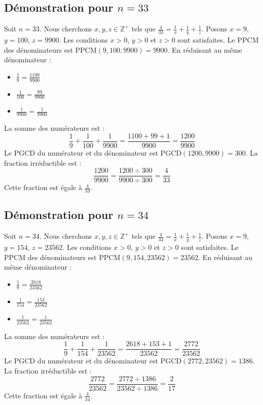 \documentclass[11pt,a4paper]{article}
\begin{document}
\subsection{Démonstration pour $n = 33$}
Soit $n = 33$. Nous cherchons $x, y, z \in \mathbb{Z}^{+}$ tels que $\frac{4}{33} = \frac{1}{x} + \frac{1}{y} + \frac{1}{z}$.
Posons $x = 9$, $y = 100$, $z = 9900$.
Les conditions $x > 0$, $y > 0$ et $z > 0$ sont satisfaites.
Le PPCM des dénominateurs est $\text{PPCM}(9, 100, 9900) = 9900$.
En réduisant au même dénominateur :
\begin{itemize}
    \item $\frac{1}{9} = \frac{1100}{9900}$
    \item $\frac{1}{100} = \frac{99}{9900}$
    \item $\frac{1}{9900} = \frac{1}{9900}$
\end{itemize}
La somme des numérateurs est :
$$ \frac{1}{9} + \frac{1}{100} + \frac{1}{9900} = \frac{1100 + 99 + 1}{9900} = \frac{1200}{9900} $$
Le PGCD du numérateur et du dénominateur est $\text{PGCD}(1200, 9900) = 300$.
La fraction irréductible est :
$$ \frac{1200}{9900} = \frac{1200 \div 300}{9900 \div 300} = \frac{4}{33} $$
Cette fraction est égale à $\frac{4}{33}$.

\subsection{Démonstration pour $n = 34$}
Soit $n = 34$. Nous cherchons $x, y, z \in \mathbb{Z}^{+}$ tels que $\frac{4}{34} = \frac{1}{x} + \frac{1}{y} + \frac{1}{z}$.
Posons $x = 9$, $y = 154$, $z = 23562$.
Les conditions $x > 0$, $y > 0$ et $z > 0$ sont satisfaites.
Le PPCM des dénominateurs est $\text{PPCM}(9, 154, 23562) = 23562$.
En réduisant au même dénominateur :
\begin{itemize}
    \item $\frac{1}{9} = \frac{2618}{23562}$
    \item $\frac{1}{154} = \frac{153}{23562}$
    \item $\frac{1}{23562} = \frac{1}{23562}$
\end{itemize}
La somme des numérateurs est :
$$ \frac{1}{9} + \frac{1}{154} + \frac{1}{23562} = \frac{2618 + 153 + 1}{23562} = \frac{2772}{23562} $$
Le PGCD du numérateur et du dénominateur est $\text{PGCD}(2772, 23562) = 1386$.
La fraction irréductible est :
$$ \frac{2772}{23562} = \frac{2772 \div 1386}{23562 \div 1386} = \frac{2}{17} $$
Cette fraction est égale à $\frac{4}{34}$.
\end{document}

